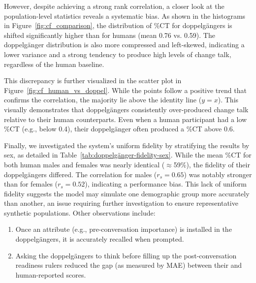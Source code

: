 However, despite achieving a strong rank correlation, a closer look at the population-level statistics reveals a systematic bias. As shown in the histograms in Figure~\ref{fig:cf_comparison}, the distribution of \%CT for doppelgängers is shifted significantly higher than for humans (mean 0.76 vs. 0.59). The doppelgänger distribution is also more compressed and left-skewed, indicating a lower variance and a strong tendency to produce high levels of change talk, regardless of the human baseline.

This discrepancy is further visualized in the scatter plot in Figure~\ref{fig:cf_human_vs_doppel}. While the points follow a positive trend that confirms the correlation, the majority lie above the identity line ($y=x$). This visually demonstrates that doppelgängers consistently over-produced change talk relative to their human counterparts. Even when a human participant had a low \%CT (e.g., below 0.4), their doppelgänger often produced a \%CT above 0.6.

Finally, we investigated the system's uniform fidelity by stratifying the results by sex, as detailed in Table~\ref{tab:doppelgänger-fidelity-sex}. While the mean \%CT for both human males and females was nearly identical ($\approx$59\%), the fidelity of their doppelgängers differed. The correlation for males ($r_s = 0.65$) was notably stronger than for females ($r_s = 0.52$), indicating a performance bias. This lack of uniform fidelity suggests the model may simulate one demographic group more accurately than another, an issue requiring further investigation to ensure representative synthetic populations. Other observations include:

\begin{enumerate}
    \item Once an attribute (e.g., pre-conversation importance) is installed in the doppelgängers, it is accurately recalled when prompted.
    \item Asking the doppelgängers to think before filling up the post-conversation readiness rulers reduced the gap (as measured by MAE) between their and human-reported scores.
\end{enumerate}



